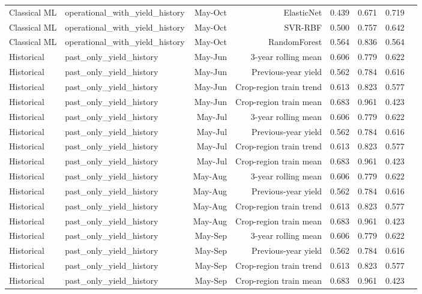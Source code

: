 \begin{tabular}{llrrrrrr}
Classical ML & operational\_with\_yield\_history & May-Oct & ElasticNet & 0.439 & 0.671 & 0.719 \\
Classical ML & operational\_with\_yield\_history & May-Oct & SVR-RBF & 0.500 & 0.757 & 0.642 \\
Classical ML & operational\_with\_yield\_history & May-Oct & RandomForest & 0.564 & 0.836 & 0.564 \\
Historical & past\_only\_yield\_history & May-Jun & 3-year rolling mean & 0.606 & 0.779 & 0.622 \\
Historical & past\_only\_yield\_history & May-Jun & Previous-year yield & 0.562 & 0.784 & 0.616 \\
Historical & past\_only\_yield\_history & May-Jun & Crop-region train trend & 0.613 & 0.823 & 0.577 \\
Historical & past\_only\_yield\_history & May-Jun & Crop-region train mean & 0.683 & 0.961 & 0.423 \\
Historical & past\_only\_yield\_history & May-Jul & 3-year rolling mean & 0.606 & 0.779 & 0.622 \\
Historical & past\_only\_yield\_history & May-Jul & Previous-year yield & 0.562 & 0.784 & 0.616 \\
Historical & past\_only\_yield\_history & May-Jul & Crop-region train trend & 0.613 & 0.823 & 0.577 \\
Historical & past\_only\_yield\_history & May-Jul & Crop-region train mean & 0.683 & 0.961 & 0.423 \\
Historical & past\_only\_yield\_history & May-Aug & 3-year rolling mean & 0.606 & 0.779 & 0.622 \\
Historical & past\_only\_yield\_history & May-Aug & Previous-year yield & 0.562 & 0.784 & 0.616 \\
Historical & past\_only\_yield\_history & May-Aug & Crop-region train trend & 0.613 & 0.823 & 0.577 \\
Historical & past\_only\_yield\_history & May-Aug & Crop-region train mean & 0.683 & 0.961 & 0.423 \\
Historical & past\_only\_yield\_history & May-Sep & 3-year rolling mean & 0.606 & 0.779 & 0.622 \\
Historical & past\_only\_yield\_history & May-Sep & Previous-year yield & 0.562 & 0.784 & 0.616 \\
Historical & past\_only\_yield\_history & May-Sep & Crop-region train trend & 0.613 & 0.823 & 0.577 \\
Historical & past\_only\_yield\_history & May-Sep & Crop-region train mean & 0.683 & 0.961 & 0.423 \\

\end{tabular}
